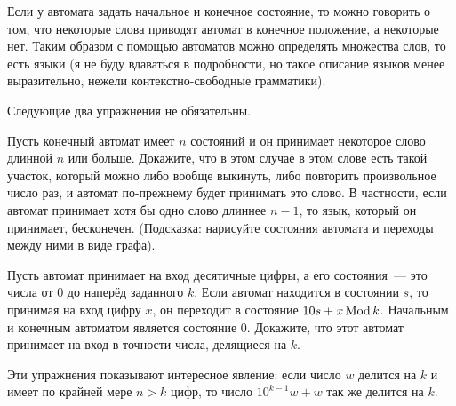 Если у автомата задать начальное и конечное состояние, то можно говорить о том, что некоторые слова приводят автомат в конечное положение, а некоторые нет. Таким образом с помощью автоматов можно определять множества слов, то есть языки (я не буду вдаваться в подробности, но такое описание языков менее выразительно, нежели контекстно-свободные грамматики).

Следующие два упражнения не обязательны.

\begin{exercise}
	Пусть конечный автомат имеет $n$ состояний и он принимает некоторое слово длинной $n$ или больше. Докажите, что в этом случае в этом слове есть такой участок, который можно либо вообще выкинуть, либо повторить произвольное число раз, и автомат по-прежнему будет принимать это слово. В частности, если автомат принимает хотя бы одно слово длиннее $n-1$, то язык, который он принимает, бесконечен. (Подсказка: нарисуйте состояния автомата и переходы между ними в виде графа).
\end{exercise}

\begin{exercise}
	Пусть автомат принимает на вход десятичные цифры, а его состояния~--- это числа от 0 до наперёд заданного $k$. Если автомат находится в состоянии $s$, то принимая на вход цифру $x$, он переходит в состояние $10s + x \operatorname{Mod} k$. Начальным и конечным автоматом является состояние 0. Докажите, что этот автомат принимает на вход в точности числа, делящиеся на $k$.
\end{exercise}

Эти упражнения показывают интересное явление: если число $w$ делится на $k$ и имеет по крайней мере $n>k$ цифр, то число $10^{k-1}w + w$ так же делится на $k$.